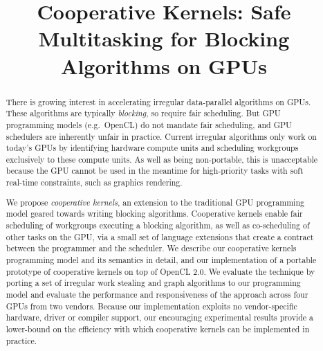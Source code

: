 \documentclass[numbers,nocopyrightspace,10pt]{sigplanconf}
\begin{document}
\title{Cooperative Kernels: Safe Multitasking for Blocking Algorithms on GPUs}

%
%

\authorinfo{}
{\makebox{} \\
}
{}




\maketitle

\begin{abstract}
There is growing interest in accelerating irregular data-parallel
algorithms on GPUs.  These algorithms are typically \emph{blocking},
so require fair scheduling.  But GPU programming models (e.g.\ OpenCL)
do not mandate fair scheduling, and GPU schedulers are inherently
unfair in practice.  Current irregular algorithms only work on today's
GPUs by identifying hardware compute units and scheduling workgroups
exclusively to these compute units.  As well as being non-portable,
this is unacceptable because the GPU cannot be used in the meantime
for high-priority tasks with soft real-time constraints,
such as graphics rendering.

We propose \emph{cooperative kernels}, an extension to the traditional
GPU programming model geared towards writing blocking algorithms.
Cooperative kernels enable fair scheduling of workgroups executing a
blocking algorithm, as well as co-scheduling of other tasks on the
GPU, via a small set of language extensions that create a contract
between the programmer and the scheduler.  We describe our cooperative
kernels programming model and its semantics in detail, and our
implementation of a portable prototype of cooperative kernels on top
of OpenCL 2.0.  We evaluate the technique by porting a set of
irregular work stealing and graph algorithms to our programming model
and evaluate the performance and responsiveness of the approach across
four GPUs from two vendors.  Because our implementation exploits no
vendor-specific hardware, driver or compiler support, our encouraging
experimental results provide a lower-bound on the efficiency with which
cooperative kernels can be implemented in practice.

\end{abstract}
    
\end{document}
